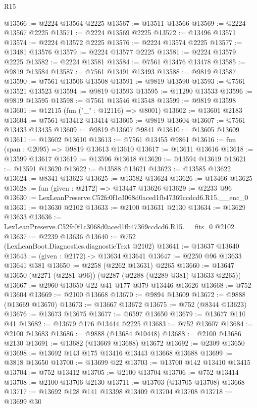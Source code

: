 \begin{lexlean}{R15}
\begin{coremodule}
@13566 := @2224 @13564 @2225
@13567 := @13511 @13566
@13569 := @2224 @13567 @2225
@13571 := @2224 @13569 @2225
@13572 := @13496 @13571
@13574 := @2224 @13572 @2225
@13576 := @2224 @13574 @2225
@13577 := @13481 @13576
@13579 := @2224 @13577 @2225
@13581 := @2224 @13579 @2225
@13582 := @2224 @13581
@13584 := @7561 @13476 @13478
@13585 := @9819 @13584
@13587 := @7561 @13491 @13493
@13588 := @9819 @13587
@13590 := @7561 @13506 @13508
@13591 := @9819 @13590
@13593 := @7561 @13521 @13523
@13594 := @9819 @13593
@13595 := @11290 @13533
@13596 := @9819 @13595
@13598 := @7561 @13546 @13548
@13599 := @9819 @13598
@13601 := @12115 (fun ("_" : @12116) => @8001)
@13602 := @13601 @2183
@13604 := @7561 @13412 @13414
@13605 := @9819 @13604
@13607 := @7561 @13433 @13435
@13609 := @9819 @13607 @9841
@13610 := @13605 @13609
@13611 := @13602 @13610
@13613 := @7561 @13455 @9861
@13616 := fun (span : @2095) => @9819 @13613 @13610
@13617 := @13611 @13616
@13618 := @13599 @13617
@13619 := @13596 @13618
@13620 := @13594 @13619
@13621 := @13591 @13620
@13622 := @13588 @13621
@13623 := @13585 @13622
@13624 := @8341 @13623
@13625 := @13582 @13624
@13626 := @13466 @13625
@13628 := fun (given : @2172) => @13447 @13626
@13629 := @2233 @96
@13630 := LexLeanPreserve.C52fc0f1c3068d0aced1fb47369ccdcd6.R15.__enc_0
@13631 := @13630 @2102
@13633 := @2100 @13631 @2130
@13634 := @13629 @13633
@13636 := LexLeanPreserve.C52fc0f1c3068d0aced1fb47369ccdcd6.R15.__fits_0 @2102
@13637 := @2239 @13636
@13640 := @752 (LexLeanBoot.Diagnostics.diagnosticText @2102)
@13641 := @13637 @13640
@13643 := (given : @2172) -> @13634 @13641
@13647 := @2250 @96 @13633 @13641 @381
@13650 := @2258 (@2262 @13631) @2265
@13660 := @13647 @13650 (@2271 (@2281 @96)) (@2287 (@2288 (@2289 @381) @13633 @2265))
@13667 := @2960 @13650 @22 @41 @177 @379 @13446 @13626
@13668 := @752 @13604
@13669 := @2100 @13668
@13670 := @9894 @13609
@13672 := @9888 (@13669 @13670)
@13673 := @13667 @13672
@13675 := @752 (@8344 @13623)
@13676 := @13673 @13675
@13677 := @6597 @13650
@13679 := @13677 @110 @41
@13682 := @13679 @176 @13444 @2225
@13683 := @752 @13607
@13684 := @2100 @13683
@13686 := @9888 (@13684 @10448)
@13688 := @2100 @13686 @2130
@13691 := @13682 (@13669 @13688) @13672
@13692 := @2309 @13650
@13698 := @13692 @143 @175 @13416 @13443 @13668 @13688
@13699 := @3818 @13650
@13700 := @13699 @22
@13703 := @13700 @142 @13410 @13415
@13704 := @752 @13412
@13705 := @2100 @13704
@13706 := @752 @13414
@13708 := @2100 @13706 @2130
@13711 := @13703 (@13705 @13708) @13668
@13717 := @13692 @128 @141 @13398 @13409 @13704 @13708
@13718 := @13699 @30

\end{coremodule}
\end{lexlean}
